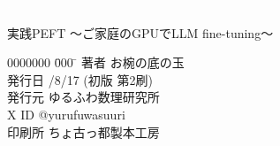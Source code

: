 \documentclass[a5paper,twoside,dvipdfmx]{jsarticle}
\begin{document}
\textcolor{white}{.}
\vspace{\baselineskip}
\vspace{\baselineskip}
\vspace{\baselineskip}
\vspace{\baselineskip}
\vspace{\baselineskip}
\vspace{\baselineskip}
\vspace{\baselineskip}
\vspace{\baselineskip}
\vspace{\baselineskip}
\vspace{\baselineskip}
\vspace{\baselineskip}
\vspace{\baselineskip}
\vspace{\baselineskip}
\vspace{\baselineskip}
\vspace{\baselineskip}
\vspace{\baselineskip}
\vspace{\baselineskip}
\begin{screen}

実践PEFT ～ご家庭のGPUでLLM fine-tuning～

\begin{tabbing}
  0000000 \= 000 \= \kill
  著者 \> お椀の底の玉 \\
  発行日 /8/17 (初版 第2刷) \\
  発行元 \> ゆるふわ数理研究所　\\
  X ID \> @yurufuwasuuri \\
  印刷所 \> ちょ古っ都製本工房
\end{tabbing}

\end{screen}

\vspace{\baselineskip}



\end{document}
